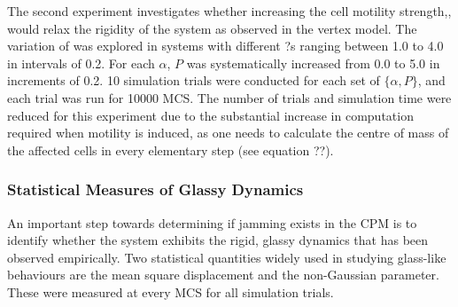 \documentclass[a4paper,12pt]{article}
\begin{document}
The second experiment investigates whether increasing the cell motility strength,, would relax the rigidity of the system as observed in the vertex model. The variation of  was explored in systems with different ?s ranging between 1.0 to 4.0 in intervals of 0.2. For each $\alpha$, $P$ was systematically increased from 0.0 to 5.0 in increments of 0.2. 10 simulation trials were conducted for each set of  $\{\alpha,P\}$, and each trial was run for 10000 MCS. The number of trials and simulation time were reduced for this experiment due to the substantial increase in computation required when motility is induced, as one needs to calculate the centre of mass of the affected cells in every elementary step (see equation ??). 

\subsubsection{Statistical Measures of Glassy Dynamics}
\label{sec:StatsMeasure}
An important step towards determining if jamming exists in the CPM is to identify whether the system exhibits the rigid, glassy dynamics that has been observed empirically. Two statistical quantities widely used in studying glass-like behaviours are the mean square displacement and the non-Gaussian parameter. These were measured at every MCS for all simulation trials. 
\end{document}
